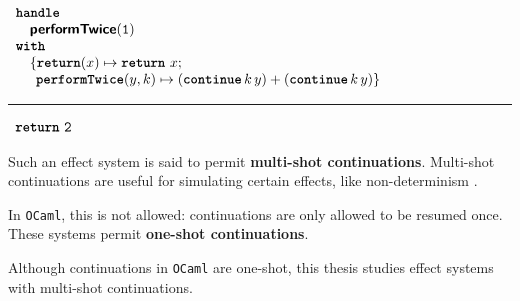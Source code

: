 \begin{enumerate}
        \begin{efflst}
          $\begin{array}{l}
            \textbf{\texttt{handle}} \\
            \quad \textbf{\textsf{performTwice}}(\texttt{1}) \\
            \textbf{\texttt{with}} \\
            \quad \{ \textbf{\texttt{return}}(x) \mapsto {\texttt{\textbf{return}} \,\, {x}}; \\
            \quad \; \, \textbf{\texttt{performTwice}}(y, k) \mapsto (\textbf{\texttt{continue}} \, {k} \, {y}) + (\textbf{\texttt{continue}} \, {k} \, {y}) \}\\
          \end{array}$
          \vspace{2mm} 
          \textcolor{effComment}{\hrule height 0.2mm \relax}
          \vspace{2mm} 
          
          \textcolor{effComment}{$\begin{array}{l}\texttt{\textbf{return}} \,\, {\texttt{2}}\end{array}$}
        \end{efflst}
        
        Such an effect system is said to permit \textbf{multi-shot continuations}. Multi-shot continuations are useful for simulating certain effects, like non-determinism \citep{phipps-costin-2023}. 

        In \texttt{OCaml}, this is not allowed: continuations are only allowed to be resumed once. These systems permit \textbf{one-shot continuations}. 

        Although continuations in \texttt{OCaml} are one-shot, this thesis studies effect systems with multi-shot continuations.
\end{enumerate}
